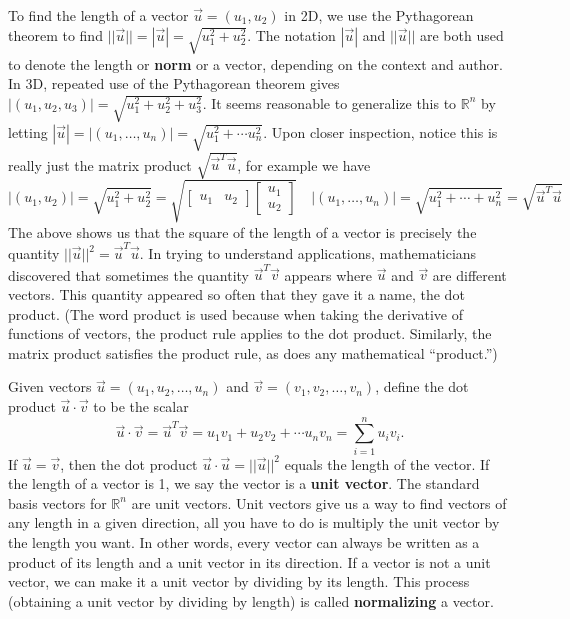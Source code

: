 \documentclass[10pt]{article}
\theoremstyle{plain}
\theoremstyle{box}
\newcommand{\R}{{\mathbb{R}}}
\begin{document}
To find the length of a vector $\vec u = (u_1,u_2)$ in 2D, we use the Pythagorean theorem to find $||\vec u|| = |\vec u| = \sqrt{u_1^2+u_2^2}$. The notation $|\vec u|$ and $||\vec u||$ are both used to denote the length or \textbf{norm} or a vector, depending on the context and author.  In 3D, repeated use of the Pythagorean theorem gives $|(u_1,u_2,u_3)|=\sqrt{u_1^2+u_2^2+u_3^2}$. It seems reasonable to generalize this to $\R^n$ by letting $|\vec u|=|(u_1,\ldots,u_n)| = \sqrt{u_1^2+\cdots u_n^2}$. Upon closer inspection, notice this is really just the matrix product $\sqrt{\vec u^T \vec u}$, for example we have
$$
|(u_1,u_2)|=\sqrt{u_1^2+u_2^2} = \sqrt{\begin{bmatrix}u_1&u_2\end{bmatrix}\begin{bmatrix}u_1\\u_2\end{bmatrix}}\quad
|(u_1,\ldots,u_n)|=\sqrt{u_1^2+\cdots+u_n^2} = \sqrt{\vec u^T \vec u}
$$
The above shows us that the square of the length of a vector is precisely the quantity $||\vec u||^2 = \vec u^T\vec u$.  In trying to understand applications, mathematicians discovered that sometimes the quantity $\vec u^T\vec v$ appears where $\vec u$ and $\vec v$ are different vectors.  This quantity appeared so often that they gave it a name, the dot product. (The word product is used because when taking the derivative of functions of vectors, the product rule applies to the dot product. Similarly, the matrix product satisfies the product rule, as does any mathematical ``product.'')

Given vectors $\vec u = (u_1,u_2,\ldots, u_n)$ and $\vec v = (v_1,v_2,\ldots, v_n)$, define the dot product $\vec u \cdot \vec v$ to be the scalar 
$$\vec u \cdot\vec v = \vec u^T\vec v = u_1v_1+u_2v_2+\cdots u_nv_n = \sum_{i=1}^n u_iv_i. $$
If $\vec u = \vec v$, then the dot product $\vec u\cdot \vec u= ||\vec u||^2$ equals the length of the vector.  If the length of a vector is 1, we say the vector is a \textbf{unit vector}. The standard basis vectors for $\R^n$ are unit vectors. Unit vectors give us a way to find vectors of any length in a given direction, all you have to do is multiply the unit vector by the length you want. In other words, every vector can always be written as a product of its length and a unit vector in its direction. If a vector is not a unit vector, we can make it a unit vector by dividing by its length.  This process (obtaining a unit vector by dividing by length) is called \textbf{normalizing} a vector.
\end{document}
